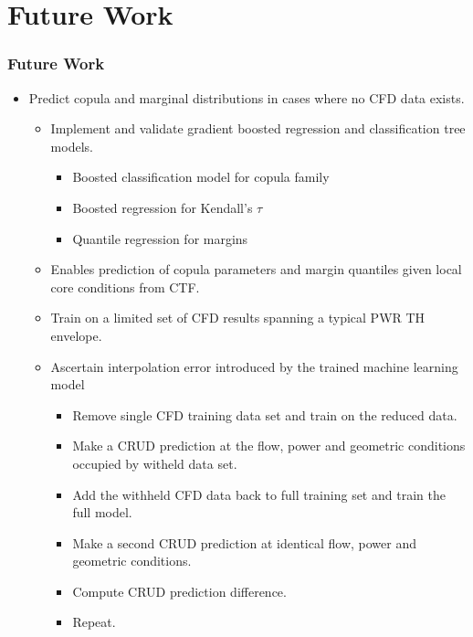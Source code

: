 \documentclass[t, pdftex]{beamer}
\begin{document}
\section{Future Work}
\begin{frame}[shrink=10]
\frametitle{Future Work}
\begin{itemize}
\item Predict copula and marginal distributions in cases where no CFD data exists.
\begin{itemize}
	\item Implement and validate gradient boosted regression and classification tree models.
	\begin{itemize}
		\item Boosted classification model for copula family
		\item Boosted regression for Kendall's $\tau$
		\item Quantile regression for margins
	\end{itemize}
	\item Enables prediction of copula parameters and margin quantiles given local core conditions from CTF.
	\item Train on a limited set of CFD results spanning a typical PWR TH envelope.
	\item Ascertain interpolation error introduced by the trained machine learning model
	\begin{itemize}
		\item Remove single CFD training data set and train on the reduced data.
		\item Make a CRUD prediction at the flow, power and geometric conditions occupied by witheld data set.
		\item Add the withheld CFD data back to full training set and train the full model.
		\item Make a second CRUD prediction at identical flow, power and geometric conditions.
		\item Compute CRUD prediction difference.
		\item Repeat.
	\end{itemize}
\end{itemize}
\end{itemize}
\end{frame}
\end{document}
